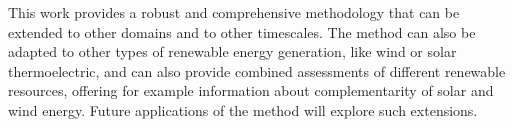 

This work provides a robust and comprehensive methodology that can be extended to other domains and to other timescales. The method can also be adapted to other types of renewable energy generation, like wind or solar thermoelectric, and can also provide combined assessments of different renewable resources, offering for example information about complementarity of solar and wind energy. Future applications of the method will explore such extensions.

